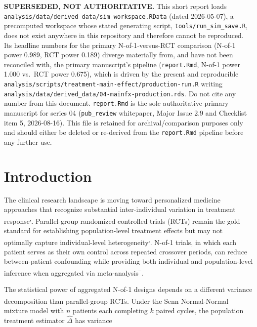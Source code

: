 \documentclass[
  11pt,
]{article}
\begin{document}
{
\setcounter{tocdepth}{2}
\tableofcontents
}
\textbf{SUPERSEDED, NOT AUTHORITATIVE.} This short report loads
\texttt{analysis/data/derived\_data/sim\_workspace.RData} (dated
2026-05-07), a precomputed workspace whose stated generating
script, \texttt{tools/run\_sim\_save.R}, does not exist anywhere in this
repository and therefore cannot be reproduced. Its headline
numbers for the primary N-of-1-versus-RCT comparison (N-of-1 power
0.989, RCT power 0.189) diverge materially from, and have not been
reconciled with, the primary manuscript's pipeline (\texttt{report.Rmd},
N-of-1 power 1.000 vs.~RCT power 0.675), which is driven by the
present and reproducible
\texttt{analysis/scripts/treatment-main-effect/production-run.R} writing
\texttt{analysis/data/derived\_data/04-mainfx-production.rds}. Do not cite
any number from this document. \texttt{report.Rmd} is the sole
authoritative primary manuscript for series 04
(\texttt{pub\_review} whitepaper, Major Issue 2.9 and Checklist item 5,
2026-08-16). This file is retained for archival/comparison purposes
only and should either be deleted or re-derived from the
\texttt{report.Rmd} pipeline before any further use.

\section{Introduction}\label{introduction}

The clinical research landscape is moving toward personalized
medicine approaches that recognize substantial inter-individual
variation in treatment response\textsuperscript{,}. Parallel-group
randomized controlled trials (RCTs) remain the gold standard for
establishing population-level treatment effects but may not
optimally capture individual-level heterogeneity\textsuperscript{,}. N-of-1 trials, in which
each patient serves as their own control across repeated
crossover periods, can reduce between-patient confounding while
providing both individual and population-level inference when
aggregated via meta-analysis\textsuperscript{--}.

The statistical power of aggregated N-of-1 designs depends on a
different variance decomposition than parallel-group RCTs. Under
the Senn\textsuperscript{} Normal-Normal
mixture model with \(n\) patients each completing \(k\) paired
cycles, the population treatment estimator \(\hat{\Delta}\) has
variance
\end{document}
